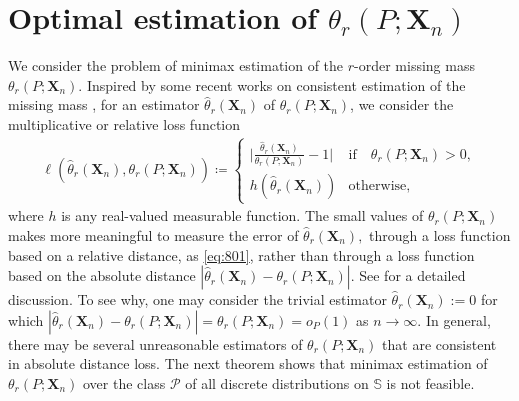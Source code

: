 \documentclass{article}
\newcommand{\1}{\boldsymbol{1}}
\theoremstyle{plain}
\begin{document}

\section{Optimal estimation of $\theta_{r}(P;\mathbf{X}_{n})$}\label{sec2}

We consider the problem of minimax estimation of the $r$-order missing mass $\theta_{r}(P;\mathbf{X}_{n})$. Inspired by some recent works on consistent estimation of the missing mass \cite{Mos(15), Fad(18)}, for an estimator $\hat{\theta}_{r}(\mathbf{X}_{n})$ of $\theta_{r}(P;\mathbf{X}_{n})$, we consider the multiplicative or relative loss function
\begin{align}
  \label{eq:801}
  \ell(\hat{\theta}_r(\mathbf{X}_{n}),\theta_r(P;\mathbf{X}_{n}))
 \coloneqq%
      \begin{cases}
    \Big|\frac{\hat{\theta}_r(\mathbf{X}_n)}{\theta_r(P;\mathbf{X}_n)} - 1\Big| &\mathrm{if}\quad\theta_r(P;\mathbf{X}_n) > 0,\\[0.2cm]
    h(\hat{\theta}_r(\mathbf{X}_n)) &\mathrm{otherwise},
  \end{cases}
\end{align}
where $h$ is any real-valued measurable function. The small values of $\theta_r(P;\mathbf{X}_n)$ makes more meaningful to measure the error of $\hat{\theta}_r(\mathbf{X}_{n}),$ through a loss function based on a relative distance, as \eqref{eq:801}, rather than through a loss function based on the absolute distance $|\hat{\theta}_r(\mathbf{X}_n) - \theta_r(P;\mathbf{X}_n)|$. See \cite{Oha(12),Mos(15)} for a detailed discussion. To see why, one may consider the trivial estimator $\hat{\theta}_r(\mathbf{X}_{n}):= 0$ for which $|\hat{\theta}_r(\mathbf{X}_n) - \theta_r(P;\mathbf{X}_n)| = \theta_r(P;\mathbf{X}_n) = o_P(1)$ as $n \to \infty$. In general, there may be several  unreasonable estimators of $\theta_{r}(P;\mathbf{X}_{n})$ that are consistent in absolute distance loss. The next theorem shows that minimax estimation of $\theta_r(P;\mathbf{X}_n)$ over the class $\mathcal{P}$ of all discrete distributions on $\mathbb{S}$ is not feasible. 
\end{document}
